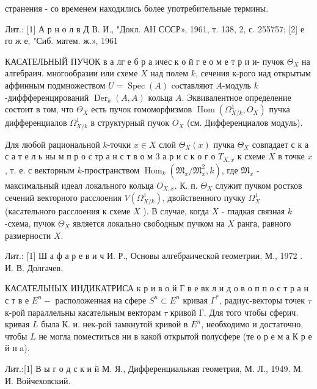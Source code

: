 \documentclass[10pt]{article}
\begin{document}
странения - со временем находились более употребительные термины.



Лит.: [1] А р н о л в Д В. И., "Докл. АН СССР», 1961, т. 138, 2, с. 255757; [2] е го ж е, "Сиб. матем. ж.», 1961



КАСАТЕЛЬНЫЙ ПУЧОК в а лг е б р а ичес к о й г е о м е т р и и- пучок $\Theta_{X}$ на алгебраич. многообразии или схеме $X$ над полем $k$, сечения к-рого над открытым аффинным подмножеством $U=\operatorname{Spec}(A)$ coставляют $A$-модуль $k$-диффференцирований $\operatorname{Der}_{k}(A, A)$ кольца $A$. Эквивалентное определение состоит в том, что $\Theta_{X}$ есть пучок гомоморфизмов $\operatorname{Hom}\left(\Omega_{X / k}^{1}, O_{X}\right)$ пучка дифференциалов $\Omega_{X / k}^{1}$ в структурный пучок $O_{X}$ (см. Дифференциалов модуль).



Для любой рациональной $k$-точки $x \in X$ слой $\Theta_{X}(x)$ пучка $\Theta_{X}$ совпадает с к а с а т е л ь ны м п р о с тр а н с т в о м 3 а р и с к о г о $T_{X, x}$ к схеме $X$ в точке $x$, т. е. с векторным $k$-пространством $\operatorname{Hom}_{k}\left(\mathfrak{M}_{x} / \mathfrak{M}_{x}^{2}, k\right)$, где $\mathfrak{M}_{x}$ - максимальный идеал локального кольца $O_{X, x}$. К. п. $\Theta_{X}$ служит пучком ростков сечений векторного расслоения $V\left(\Omega_{X / k}^{1}\right)$, двойственного пучку $\Omega_{X}^{1}$ (касательного расслоения к схеме $X$ ). В случае, когда $X$ - гладкая связная $k$-схема, пучок $\Theta_{X}$ является локально свободным пучком на $X$ ранга, равного размерности $X$.



Лит.: [1] Ш а ф а р е в и ч И. Р., Основы алгебраической геометрии, М., 1972 . И. В. Долгачев.



КАСАТЕЛЬНЫХ ИНДИКАТРИСА к р и в о й Г в е вк л и д о в о п п о с т р а н с т в е $E^{n}-$ расположенная на сфере $S^{n} \subset E^{n}$ кривая $\Gamma^{*}$, радиус-векторы точек $\tau$ к-рой параллельны касательным векторам $\tau$ кривой Г. Для того чтобы сферич. кривая $L$ была К. и. нек-рой замкнутой кривой в $E^{n}$, необходимо и достаточно, чтобы $L$ не могла поместиться ни в какой открытой полусфере (те о р е м а К р е й н a).



Лит.:[1] В ы г о д с к и й М. Я., Дифференциальная геометрия, М. Л., 1949. М. И. Войчеховский.
\end{document}
